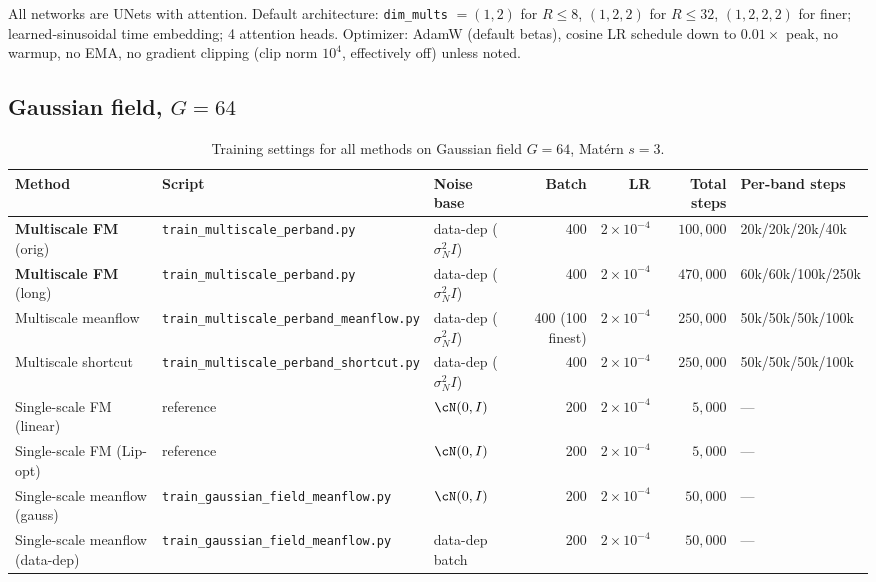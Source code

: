 \documentclass[11pt]{article}
\begin{document}
All networks are UNets with attention. Default architecture: \texttt{dim\_mults} $= (1,2)$ for $R\le 8$, $(1,2,2)$ for $R\le 32$, $(1,2,2,2)$ for finer; learned-sinusoidal time embedding; 4 attention heads. Optimizer: AdamW (default betas), cosine LR schedule down to $0.01\times$ peak, no warmup, no EMA, no gradient clipping (clip norm $10^4$, effectively off) unless noted.

\subsection{Gaussian field, $G=64$}

\begin{table}[ht]
\centering
\small
\caption{Training settings for all methods on Gaussian field $G=64$, Mat\'ern $s=3$.}
\label{tab:train-gf}
\begin{tabular}{@{}lllrrrl@{}}
\toprule
Method & Script & Noise base & Batch & LR & Total steps & Per-band steps \\
\midrule
\textbf{Multiscale FM} (orig)
   & \texttt{train\_multiscale\_perband.py} & data-dep ($\sigma_N^2 I$) & 400 & $2\times 10^{-4}$ & $100{,}000$ & 20k/20k/20k/40k \\
\textbf{Multiscale FM} (long)
   & \texttt{train\_multiscale\_perband.py} & data-dep ($\sigma_N^2 I$) & 400 & $2\times 10^{-4}$ & $470{,}000$ & 60k/60k/100k/250k \\
Multiscale meanflow
   & \texttt{train\_multiscale\_perband\_meanflow.py} & data-dep ($\sigma_N^2 I$) & 400 (100 finest) & $2\times 10^{-4}$ & $250{,}000$ & 50k/50k/50k/100k \\
Multiscale shortcut
   & \texttt{train\_multiscale\_perband\_shortcut.py} & data-dep ($\sigma_N^2 I$) & 400 & $2\times 10^{-4}$ & $250{,}000$ & 50k/50k/50k/100k \\
Single-scale FM (linear)
   & \cite{chen2025scale} reference & $\cN(0,I)$ & 200 & $2\times 10^{-4}$ & $5{,}000$ & --- \\
Single-scale FM (Lip-opt)
   & \cite{chen2025scale} reference & $\cN(0,I)$ & 200 & $2\times 10^{-4}$ & $5{,}000$ & --- \\
Single-scale meanflow (gauss)
   & \texttt{train\_gaussian\_field\_meanflow.py} & $\cN(0,I)$ & 200 & $2\times 10^{-4}$ & $50{,}000$ & --- \\
Single-scale meanflow (data-dep)
   & \texttt{train\_gaussian\_field\_meanflow.py} & data-dep batch & 200 & $2\times 10^{-4}$ & $50{,}000$ & --- \\
\bottomrule
\end{tabular}
\end{table}
\end{document}
